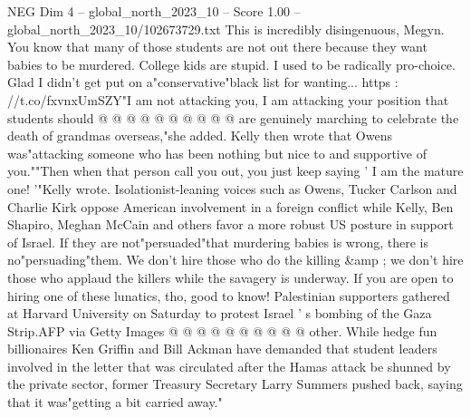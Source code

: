 \begin{textsample}{NEG Dim 4 – global\_north\_2023\_10 – Score 1.00 – global\_north\_2023\_10/102673729.txt}
This is incredibly disingenuous, Megyn.
You know that many of those students are not out there because they want babies to be murdered.
College kids are stupid.
I used to be radically pro-choice.
Glad I didn't get put on a"conservative"black list for wanting... https : //t.co/fxvnxUmSZY"I am not attacking you, I am attacking your position that students should @ @ @ @ @ @ @ @ @ @ are genuinely marching to celebrate the death of grandmas overseas,"she added.
Kelly then wrote that Owens was"attacking someone who has been nothing but nice to and supportive of you.""Then when that person call you out, you just keep saying ' I am the mature one! '"Kelly wrote.
Isolationist-leaning voices such as Owens, Tucker Carlson and Charlie Kirk oppose American involvement in a foreign conflict while Kelly, Ben Shapiro, Meghan McCain and others favor a more robust US posture in support of Israel.
If they are not"persuaded"that murdering babies is wrong, there is no"persuading"them.
We don't hire those who do the killing \&amp ; we don't hire those who applaud the killers while the savagery is underway.
If you are open to hiring one of these lunatics, tho, good to know!
Palestinian supporters gathered at Harvard University on Saturday to protest Israel ' s bombing of the Gaza Strip.AFP via Getty Images @ @ @ @ @ @ @ @ @ @ other.
While hedge fun billionaires Ken Griffin and Bill Ackman have demanded that student leaders involved in the letter that was circulated after the Hamas attack be shunned by the private sector, former Treasury Secretary Larry Summers pushed back, saying that it was"getting a bit carried away."

\end{textsample}
